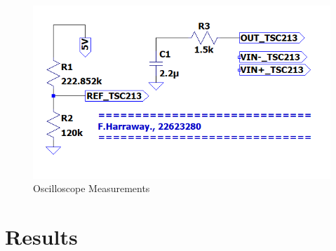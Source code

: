 \begin{figure}[!htb]
\centering
\includegraphics[scale=0.45]{./Figures/circ.png}
\caption{Oscilloscope Measurements}
\label{fig:circ}
\end{figure}

\newpage
\section{Results}

